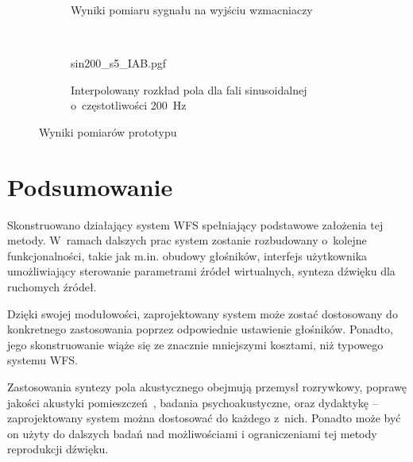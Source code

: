 \documentclass[10pt, a4paper]{article}
\let\Oldsection\section
\renewcommand{\section}{\FloatBarrier\Oldsection}
\begin{document}
\begin{figure}[!tbh]
  \centering
  \begin{subfigure}[b]{.49\textwidth}
    \centering
    \caption{Wyniki pomiaru sygnału na wyjściu wzmacniaczy}
    \label{r:pomiar_el}
  \end{subfigure}
  ~
  \begin{subfigure}[b]{.49\textwidth}
    \centering
    {sin200_s5_IAB.pgf}
    \caption{Interpolowany rozkład pola dla fali sinusoidalnej o~częstotliwości \SI{200}{\hertz}}
    \label{r:pomiar_kb}
  \end{subfigure}
  \caption{Wyniki pomiarów prototypu}
\end{figure}

\section{Podsumowanie}

Skonstruowano działający system WFS spełniający podstawowe założenia tej metody.
W~ramach dalszych prac system zostanie rozbudowany o~kolejne funkcjonalności,
takie jak m.in. obudowy głośników, interfejs użytkownika umożliwiający sterowanie 
parametrami źródeł wirtualnych, synteza dźwięku dla ruchomych źródeł.

Dzięki swojej modułowości, zaprojektowany system może zostać dostosowany do 
konkretnego zastosowania poprzez odpowiednie ustawienie głośników. Ponadto,
jego skonstruowanie wiąże się ze znacznie mniejszymi kosztami, niż typowego
systemu WFS.

Zastosowania syntezy pola akustycznego obejmują przemysł rozrywkowy, poprawę
jakości akustyki pomieszczeń~\cite{enhancement}, badania psychoakustyczne,
oraz dydaktykę -- zaprojektowany system można dostosować do każdego z~nich.
Ponadto może być on użyty do dalszych badań nad możliwościami i ograniczeniami
tej metody reprodukcji dźwięku.

\printbibliography
\end{document}
